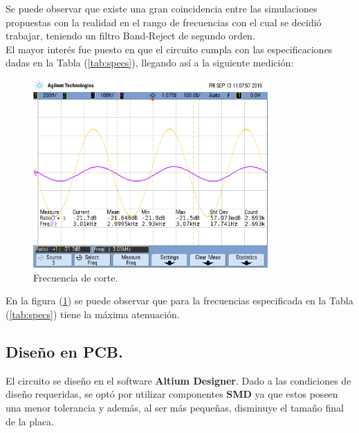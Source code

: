 Se puede observar que existe una gran coincidencia entre las simulaciones propuestas con la realidad en el rango de frecuencias con el cual se decidió trabajar, teniendo un filtro Band-Reject de segundo orden.\\
El mayor interés fue puesto en que el circuito cumpla con las especificaciones dadas en la Tabla (\ref{tab:specs}), llegando así a la siguiente medición:

\begin{figure}[H]	
	\centering
	\includegraphics[width=0.8\textwidth, trim = {0 3.35cm 0 2cm},clip]{ImagenesEj2/MedicionesGrilla/fc_br.png}
	\caption{Frecuencia de corte.}
	\label{fig:fcbr}
\end{figure}

En la figura (\ref{fig:fcbr}) se puede observar que para la frecuencias especificada en la Tabla (\ref{tab:specs}) tiene la máxima atenuación.

\newpage
\subsection{Diseño en PCB.}

El circuito se diseño en el software \textbf{Altium Designer}. Dado a las condiciones de diseño requeridas, se optó por utilizar componentes \textbf{SMD} ya que estos poseen una menor tolerancia y además, al ser más pequeñas, disminuye el tamaño final de la placa.

